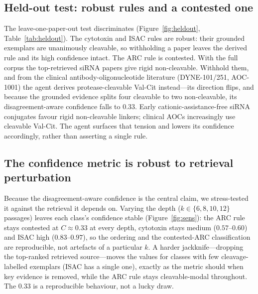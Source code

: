 \documentclass[10pt]{article}
\begin{document}
\subsection{Held-out test: robust rules and a contested one}
The leave-one-paper-out test discriminates (Figure~\ref{fig:heldout}, Table~\ref{tab:heldout}). The cytotoxin and ISAC rules are robust: their grounded exemplars are unanimously cleavable, so withholding a paper leaves the derived rule and its high confidence intact. The ARC rule is contested. With the full corpus the top-retrieved siRNA papers give rigid non-cleavable. Withhold them, and from the clinical antibody-oligonucleotide literature (DYNE-101/251, AOC-1001) the agent derives protease-cleavable Val-Cit instead---its direction flips, and because the grounded evidence splits four cleavable to two non-cleavable, its disagreement-aware confidence falls to 0.33. Early cationic-assistance-free siRNA conjugates favour rigid non-cleavable linkers; clinical AOCs increasingly use cleavable Val-Cit. The agent surfaces that tension and lowers its confidence accordingly, rather than asserting a single rule.

\subsection{The confidence metric is robust to retrieval perturbation}
Because the disagreement-aware confidence is the central claim, we stress-tested it against the retrieval it depends on. Varying the depth ($k\in\{6,8,10,12\}$ passages) leaves each class's confidence stable (Figure~\ref{fig:sens}): the ARC rule stays contested at $C\approx0.33$ at every depth, cytotoxin stays medium ($0.57$--$0.60$) and ISAC high ($0.83$--$0.97$), so the ordering and the contested-ARC classification are reproducible, not artefacts of a particular $k$. A harder jackknife---dropping the top-ranked retrieved source---moves the values for classes with few cleavage-labelled exemplars (ISAC has a single one), exactly as the metric should when key evidence is removed, while the ARC rule stays cleavable-modal throughout. The 0.33 is a reproducible behaviour, not a lucky draw.
\end{document}
